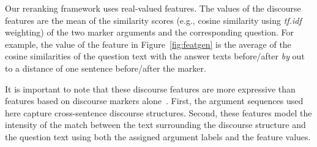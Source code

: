 {}
Our reranking framework uses real-valued features. 
The values of the discourse features are the mean of the similarity scores (e.g., cosine similarity using {\em tf.idf} weighting) of the two marker arguments and the corresponding question. For example, the value of the  feature in Figure~\ref{fig:featgen} is the average of the cosine similarities of the question text with the answer texts before/after {\em by} out to a distance of one sentence before/after the marker.%

%
%

It is important to note that these discourse features are more expressive than features based on discourse markers alone~\cite{Higashinaka:08,Verberne:10}. First, the argument sequences used here capture cross-sentence discourse structures.  Second, these features model the intensity of the match between the text surrounding the discourse structure and the question text using both the assigned argument labels and the  feature values.

